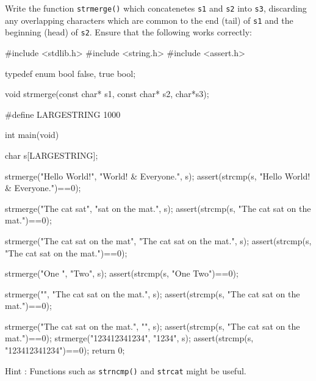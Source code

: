 
\begin{exercise}
Write the function \verb^strmerge()^ which concatenetes \verb^s1^ and \verb^s2^ into \verb^s3^,
discarding any overlapping characters which are common to the end (tail) of \verb^s1^ and the 
beginning (head) of \verb^s2^.
Ensure that the following
works correctly:
\begin{codesnippet}
#include <stdlib.h>
#include <string.h>
#include <assert.h>

typedef enum bool {false, true} bool;

void strmerge(const char* s1, const char* s2, char*s3);

#define LARGESTRING 1000

int main(void)
{
   char s[LARGESTRING];

   strmerge("Hello World!", "World! & Everyone.", s);
   assert(strcmp(s, "Hello World! & Everyone.")==0);

   strmerge("The cat sat", "sat on the mat.", s);
   assert(strcmp(s, "The cat sat on the mat.")==0);

   strmerge("The cat sat on the mat", "The cat sat on the mat.", s);
   assert(strcmp(s, "The cat sat on the mat.")==0);

   strmerge("One ", "Two", s);
   assert(strcmp(s, "One Two")==0);

   strmerge("", "The cat sat on the mat.", s);
   assert(strcmp(s, "The cat sat on the mat.")==0);

   strmerge("The cat sat on the mat.", "", s);
   assert(strcmp(s, "The cat sat on the mat.")==0);
                                                                                                                                                    strmerge("123412341234", "1234", s);
   assert(strcmp(s, "123412341234")==0);
                                                                                                                                                    return 0;
}
\end{codesnippet}
Hint : Functions such as \verb^strncmp()^ and \verb^strcat^ might be useful.
\end{exercise}
